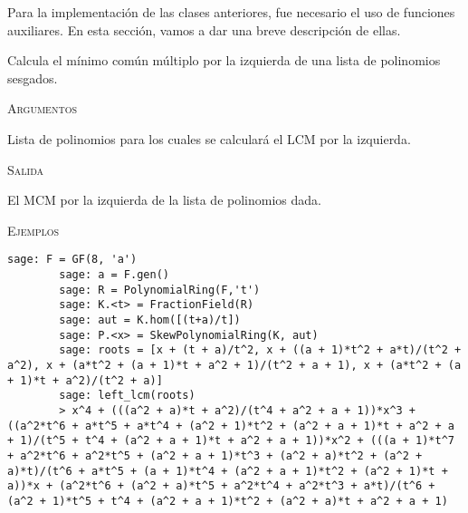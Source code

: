 Para la implementación de las clases anteriores, fue necesario el uso de funciones auxiliares. En esta sección, vamos a dar una breve descripción de ellas.



\begin{description}[leftmargin=1em, font=\ttfamily, style=nextline]
    \item[left\_lcm(poly\_list)]
    
    Calcula el mínimo común múltiplo por la izquierda de una lista de polinomios sesgados.

    \textsc{Argumentos}

    \begin{description}[font=\ttfamily]
        \item[poly\_list] Lista de polinomios para los cuales se calculará el LCM por la izquierda.
    \end{description}

    \textsc{Salida}

    \begin{description}[font=\normalfont\ttfamily]
        \item[] El MCM por la izquierda de la lista de polinomios dada.
    \end{description}

    \textsc{Ejemplos}

    \begin{lstlisting}[gobble=8]
        sage: F = GF(8, 'a')
        sage: a = F.gen()
        sage: R = PolynomialRing(F,'t')
        sage: K.<t> = FractionField(R)
        sage: aut = K.hom([(t+a)/t])
        sage: P.<x> = SkewPolynomialRing(K, aut)
        sage: roots = [x + (t + a)/t^2, x + ((a + 1)*t^2 + a*t)/(t^2 + a^2), x + (a*t^2 + (a + 1)*t + a^2 + 1)/(t^2 + a + 1), x + (a*t^2 + (a + 1)*t + a^2)/(t^2 + a)]
        sage: left_lcm(roots)
        > x^4 + (((a^2 + a)*t + a^2)/(t^4 + a^2 + a + 1))*x^3 + ((a^2*t^6 + a*t^5 + a*t^4 + (a^2 + 1)*t^2 + (a^2 + a + 1)*t + a^2 + a + 1)/(t^5 + t^4 + (a^2 + a + 1)*t + a^2 + a + 1))*x^2 + (((a + 1)*t^7 + a^2*t^6 + a^2*t^5 + (a^2 + a + 1)*t^3 + (a^2 + a)*t^2 + (a^2 + a)*t)/(t^6 + a*t^5 + (a + 1)*t^4 + (a^2 + a + 1)*t^2 + (a^2 + 1)*t + a))*x + (a^2*t^6 + (a^2 + a)*t^5 + a^2*t^4 + a^2*t^3 + a*t)/(t^6 + (a^2 + 1)*t^5 + t^4 + (a^2 + a + 1)*t^2 + (a^2 + a)*t + a^2 + a + 1)
    \end{lstlisting}     

\end{description}

